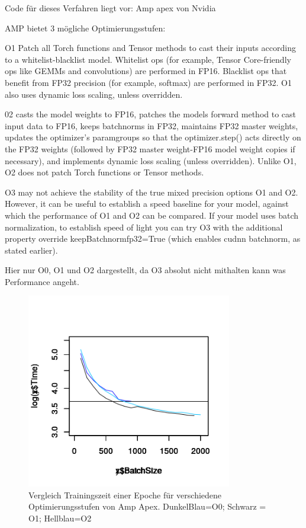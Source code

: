 Code für dieses Verfahren liegt vor: Amp apex von Nvidia

AMP bietet 3 mögliche Optimierungsstufen:

O1
Patch all Torch functions and Tensor methods to cast their inputs according to a whitelist-blacklist model. Whitelist ops (for example, Tensor Core-friendly ops like GEMMs and convolutions) are performed in FP16. Blacklist ops that benefit from FP32 precision (for example, softmax) are performed in FP32. O1 also uses dynamic loss scaling, unless overridden.

02
casts the model weights to FP16, patches the models forward method to cast input data to FP16, keeps batchnorms in FP32, maintains FP32 master weights, updates the optimizer’s paramgroups so that the optimizer.step() acts directly on the FP32 weights (followed by FP32 master weight-FP16 model weight copies if necessary), and implements dynamic loss scaling (unless overridden). Unlike O1, O2 does not patch Torch functions or Tensor methods.


O3
may not achieve the stability of the true mixed precision options O1 and O2. However, it can be useful to establish a speed baseline for your model, against which the performance of O1 and O2 can be compared. If your model uses batch normalization, to establish speed of light you can try O3 with the additional property override keepBatchnormfp32=True (which enables cudnn batchnorm, as stated earlier).

Hier nur O0, O1 und O2 dargestellt, da O3 absolut nicht mithalten kann was Performance angeht.

\begin{figure}[h]
 \centering
 \includegraphics[width=0.8\textwidth]{KapitelPartB/Images/timeVsBatchSize_Amp.png}
 \caption{Vergleich Trainingszeit einer Epoche für verschiedene Optimierungsstufen von Amp Apex. DunkelBlau=O0; Schwarz = O1; Hellblau=O2}
 \label{fig:amp}
\end{figure}

